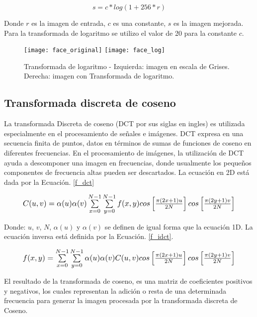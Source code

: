 \begin{equation}
\label{f_log}
s = c*log(1+ 256*r)
\end{equation}

Donde $r$ es la imagen de entrada, $c$ es una constante, $s$ es la imagen mejorada. Para la transformada de logaritmo se utilizo el valor de 20 para la constante $ c $. 

\begin{figure}[h]
\center
\texttt{[image: face\_original]}
\hspace{1cm}
\texttt{[image: face\_log]}
\caption{Transformada de logaritmo - Izquierda: imagen en escala de Grises. Derecha: imagen con Transformada de logaritmo.}
\label{im:log}
\end{figure}

\subsection{Transformada discreta de coseno}
La transformada Discreta de coseno (DCT por sus siglas en ingles) es utilizada especialmente en el procesamiento de señales e imágenes. DCT expresa en una secuencia finita de puntos, datos en términos de sumas de funciones de coseno en diferentes frecuencias. En el procesamiento de imágenes, la utilización de DCT ayuda a descomponer una imagen en frecuencias, donde usualmente los pequeños componentes de frecuencia altas pueden ser descartados. La ecuación en 2D está dada por la Ecuación. \ref{f_dct}
\cite{thamiz2015liter}\cite{vish2015ill}

\begin{equation}
	\label{f_dct}
	\resizebox{0.91\hsize}{!}{
		$ C(u,v) = \alpha(u)\alpha(v)\sum\limits_{x=0}^{N-1} \sum\limits_{y=0}^{N-1}f(x,y)cos\left[\frac{\pi(2x + 1)u}{2N}\right]cos\left[\frac{\pi(2y + 1)v}{2N}\right] $
	}
\end{equation}

Donde: $u$, $v$, $N$, $\alpha(u)$ y $\alpha(v)$ se definen de igual forma que la ecuación 1D. La ecuación inversa está definida por la Ecuación. \ref{f_idct}.

\begin{equation}
	\label{f_idct}
	\resizebox{0.91\hsize}{!}{
		$ f(x,y) = \sum\limits_{x=0}^{N-1}\sum\limits_{y=0}^{N-1} \alpha(u)\alpha(v)C(u,v)cos\left[\frac{\pi(2x + 1)u}{2N}\right]cos\left[\frac{\pi(2y + 1)v}{2N}\right]$
	}
\end{equation}

El resultado de la transformada de coseno, es una matriz de coeficientes positivos y negativos, los cuales representan la adición o resta de una determinada frecuencia para generar la imagen procesada por la transformada discreta de Coseno.

